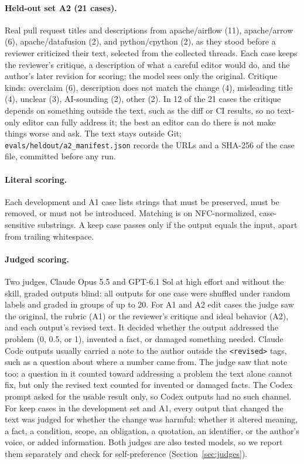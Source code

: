 \documentclass[11pt]{article}
\newcommand{\code}[1]{\texttt{#1}}
\begin{document}
\paragraph{Held-out set A2 (21 cases).} Real pull request titles and descriptions from
apache/airflow (11), apache/arrow (6), apache/datafusion (2), and python/cpython (2), as
they stood before a reviewer criticized their text, selected from the collected threads.
Each case keeps the reviewer's critique, a description of what a careful editor would do,
and the author's later revision for scoring; the model sees only the original. Critique
kinds: overclaim (6), description does not match the change (4), misleading title (4),
unclear (3), AI-sounding (2), other (2). In 12 of the 21 cases the critique depends on
something outside the text, such as the diff or CI results, so no text-only editor can
fully address it; the best an editor can do there is not make things worse and ask. The
text stays outside Git; \code{evals/heldout/a2\_manifest.json} records the URLs and a
SHA-256 of the case file, committed before any run.

\paragraph{Literal scoring.} Each development and A1 case lists strings that must be
preserved, must be removed, or must not be introduced. Matching is on NFC-normalized,
case-sensitive substrings. A keep case passes only if the output equals the input, apart
from trailing whitespace.

\paragraph{Judged scoring.} Two judges, Claude Opus 5.5 and GPT-6.1 Sol at high effort and
without the skill, graded outputs blind: all outputs for one case were shuffled under
random labels and graded in groups of up to 20. For A1 and A2 edit cases the judge saw the
original, the rubric (A1) or the reviewer's critique and ideal behavior (A2), and each
output's revised text. It decided whether the output addressed the problem (0, 0.5, or 1),
invented a fact, or damaged something needed. Claude Code outputs usually carried a note
to the author outside the \code{<revised>} tags, such as a question about where a number
came from. The judge saw that note too: a question in it counted toward addressing a
problem the text alone cannot fix, but only the revised text counted for invented or
damaged facts. The Codex prompt asked for the usable result only, so Codex outputs had no
such channel. For keep cases in the development set and A1, every output that changed
the text was judged for whether the change was harmful: whether it altered meaning, a
fact, a condition, scope, an obligation, a quotation, an identifier, or the author's
voice, or added information. Both judges are also tested models, so we report them
separately and check for self-preference (Section~\ref{sec:judges}).
\end{document}
